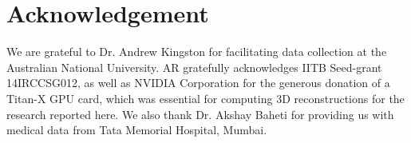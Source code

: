 \documentclass[journal]{IEEEtran}
\begin{document}
\section{Acknowledgement}
We are grateful to Dr. Andrew Kingston for facilitating data
collection at the Australian National University. AR gratefully
acknowledges IITB Seed-grant 14IRCCSG012, as well as NVIDIA
Corporation for the generous donation of a Titan-X GPU card, which was
essential for computing 3D reconstructions for the research reported
here. We also thank Dr. Akshay Baheti for providing us with medical
data from Tata Memorial Hospital, Mumbai.
{%
}
\end{document}
